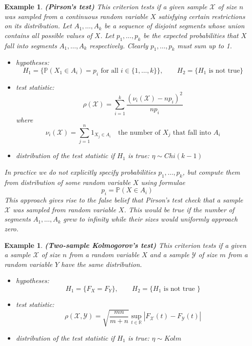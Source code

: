 \documentclass[12pt]{article}
\newtheorem{example}[theorem]{Example}
\begin{document}
\begin{example} \textbf{(Pirson's test)} This criterion tests if a given sample
    $\mathscr{X}$ of size $n$ was sampled from a continuous random variable $X$
    satisfying certain restrictions on its distribution. Let $A_1,\ldots,A_k$ be
    a sequence of disjoint segments whose union contains all possible values of
    $X$. Let $p_1,\ldots,p_k$ be the expected probabilities that $X$ fall into
    segments $A_1,\ldots,A_k$ respectively. Clearly $p_1,\ldots,p_k$ must sum up
    to 1.
    \begin{itemize}
        \item hypotheses:
              $$H_1=\{\mathbb{P}(X_1\in A_i)=p_i\mbox{ for all }
                  i\in \{1,\ldots,k\} \},\quad\quad H_2=\{H_1\mbox{ is not
                      true}\}$$
        \item test statistic:
              $$\rho(\mathscr{X})=\sum_{i=1}^k
                  \frac{{(\nu_i(\mathscr{X})-np_i)}^2}{n p_i}
              $$
              where
              $$
                  \nu_i(\mathscr{X})
                  =\sum_{j=1}^n 1_{X_j\in A_i}
                  \quad\mbox{the number of }X_j\mbox{ that fall into }A_i
              $$
        \item distribution of the test statistic if $H_1$ is true:
              $\eta\sim Chi(k-1)$
    \end{itemize}
    In practice we do not explicitly specify probabilities
    $p_1,\ldots,p_k$, but compute them from distribution of some
    random variable $X$ using formulae
    $$
        p_i=\mathbb{P}(X\in A_i)
    $$
    This approach gives rise to the false belief that Pirson's test check
    that a sample $\mathscr{X}$ was sampled from random variable $X$.
    This would be true if the number of segments $A_1,\ldots,A_k$ grew to
    infinity while their sizes would uniformly approach zero.
\end{example}

\begin{example} \textbf{(Two-sample Kolmogorov's test)} This criterion tests
    if a given a sample $\mathscr{X}$ of size $n$ from a random variable $X$
    and a sample $\mathscr{Y}$ of size $m$ from a random variable $Y$
    have the same distribution.
    \begin{itemize}
        \item hypotheses:
              $$
                  H_1=\{F_X=F_Y\},\quad\quad H_2=\{H_1\mbox{ is not true }\}
              $$
        \item test statistic:
              $$
                  \rho(\mathscr{X},\mathscr{Y})
                  =\sqrt{\frac{mn}{m+n}}
                  \sup_{t\in\mathbb{R}}|F_{\mathscr{X}}(t)-F_{\mathscr{Y}}(t)|
              $$
        \item distribution of the test statistic if $H_1$ is true: $\eta\sim Kolm$
    \end{itemize}
\end{example}
\end{document}
